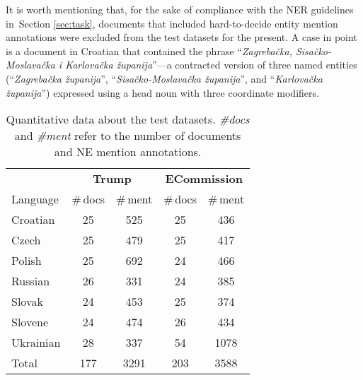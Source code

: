 \documentclass[11pt]{article}
\begin{document}
It is worth mentioning that, for the sake of compliance with the NER guidelines in~Section
\ref{sec:task}, documents that included hard-to-decide entity mention annotations were
excluded from the test datasets for the present.  {A case in point is a document in Croatian
  that contained the phrase ``\textit{Zagrebačka, Sisačko-Moslavačka i Karlovačka
    županija}''---a contracted version of three named entities (``\textit{Zagrebačka
    županija}'', ``\textit{Sisačko-Moslavačka županija}'', and ``\textit{Karlovačka
    županija}'') expressed using a head noun with three coordinate modifiers.}

\begin{table}
  \begin{center}
    \begin{footnotesize}
      \begin{tabular}{lcccc}
        \toprule 
        & \multicolumn{2}{c}{\textbf{{\sc Trump}}} & \multicolumn{2}{c}{\textbf{{\sc ECommission}}} \\
        \cmidrule(lr){2-3}
        \cmidrule(lr){4-5}
        Language &  \#\,docs & \#\,ment & \#\,docs & \#\,ment \\
        \midrule
        Croatian & 25 & 525 & 25 & 436 \\
        Czech & 25 & 479  & 25 & 417 \\
        Polish & 25 & 692  & 24 & 466 \\
        Russian & 26 & 331  & 24 & 385 \\
        Slovak  & 24 & 453  & 25 & 374 \\
        Slovene & 24 & 474  & 26 & 434 \\
        Ukrainian & 28 & 337  & 54 & 1078 \\
        \midrule
        Total & 177 & 3291  & 203 & 3588 \\

        \bottomrule
      \end{tabular}
    \end{footnotesize}
  \end{center}
  \caption{Quantitative data about the test datasets. {\em \#docs} and {\em \#ment} refer to
    the number of documents and NE mention annotations.} 
  \label{tab:datasets}
\end{table}
\end{document}
